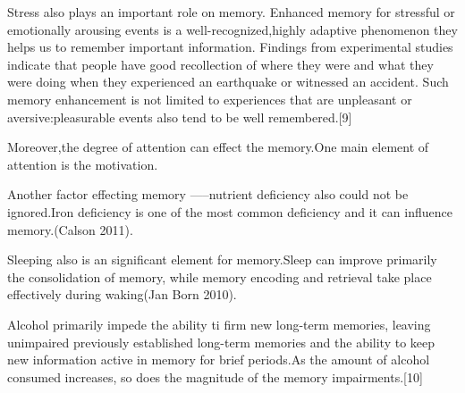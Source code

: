 \documentclass{article}
\begin{document}
Stress also plays an important role on memory. Enhanced memory for stressful or emotionally arousing events is a well-recognized,highly adaptive phenomenon they helps us to remember important information. Findings from experimental studies indicate that people have good recollection of where they were and what they were doing when they experienced an earthquake or witnessed an accident. Such memory enhancement is not limited to experiences that are unpleasant or aversive:pleasurable events also tend to be well remembered.[9] 

Moreover,the degree of attention can effect the memory.One main element of attention is the motivation. 

Another factor effecting memory -----nutrient deficiency also could not be ignored.Iron deficiency is one of the most common deficiency and it can influence memory.(Calson 2011).

Sleeping also is an significant element for memory.Sleep can improve primarily the consolidation of memory, while memory encoding and retrieval take place effectively during waking(Jan Born 2010).

Alcohol primarily impede the ability ti firm new long-term memories, leaving unimpaired previously established long-term memories and the ability to keep new information active in memory for brief periods.As the amount of alcohol consumed increases, so does the magnitude of the memory impairments.[10]


\printbibliography[title={Reference},heading=bibnumbered]{}
\end{document}
